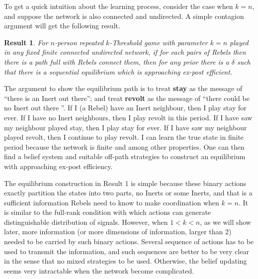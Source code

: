 \documentclass[12pt,letter]{article}
\newtheorem{result}{Result}
\theoremstyle{remark}
\theoremstyle{remark}
\theoremstyle{claim}
\begin{document}
To get a quick intuition about the learning process, consider the case when $k=n$, and suppose the network is also connected and undirected. A simple contagion argument will get the following result.
\begin{result}
For $n$-person repeated $k$-Threshold game with parameter $k=n$ played in any fixed finite connected undirected network, if for each pairs of Rebels then there is a path full with Rebels connect them, then for any prior there is a $\delta$ such that there is a sequential equilibrium which is approaching ex-post efficient.
\end{result}

The argument to show the equilibrium path is to treat \textbf{stay} as the message of ``there is an Inert out there''; and treat \textbf{revolt} as the message of ``there could be no Inert out there ''. If I (a Rebel) have an Inert neighbour, then I play stay for ever. If I have no Inert neighbours, then I play revolt in this period. If I have saw my neighbour played stay, then I play stay for ever. If I have saw my neighbour played revolt, then I continue to play revolt. I can learn the true state in finite period because the network is finite and among other properties. One can then find a belief system and suitable off-path strategies to construct an equilibrium with approaching ex-post efficiency. 

The equilibrium construction in Result 1 is simple because these binary actions exactly partition the states into two parts, no Inerts or some Inerts, and that is a sufficient information Rebels need to know to make coordination when $k=n$. It is similar to the full-rank condition with which actions can generate distinguishable distribution of signals. However, when $1<k<n$, as we will show later, more information (or more dimensions of information, larger than $2$) needed to be carried by such binary actions. Several sequence of actions has to be used to transmit the information, and such sequences are better to be very clear in the sense that no mixed strategies to be used. Otherwise, the belief updating seems very intractable when the network become complicated.
\end{document}
